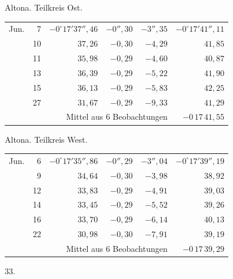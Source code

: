 \noindent\begin{minipage}[t]{.495\textwidth}\centering Altona. Teilkreis Ost.\par\smallskip
{\scriptsize\setlength{\tabcolsep}{1pt}\renewcommand{\arraystretch}{1.2}\begin{tabular}{lr|r|r|r|r|}
Jun.&7&$-0^\circ17'37''{,}46$&$-0''{,}30$&$-3''{,}35$&$-0^\circ17'41''{,}11$\\
&10&$37{,}26$&$-0{,}30$&$-4{,}29$&$41{,}85$\\
&11&$35{,}98$&$-0{,}29$&$-4{,}60$&$40{,}87$\\
&13&$36{,}39$&$-0{,}29$&$-5{,}22$&$41{,}90$\\
&15&$36{,}13$&$-0{,}29$&$-5{,}83$&$42{,}25$\\
&27&$31{,}67$&$-0{,}29$&$-9{,}33$&$41{,}29$\\
\cline{6-6}\multicolumn{5}{r}{Mittel aus 6 Beobachtungen}&$-0\,17\,41{,}55$
\end{tabular}}\end{minipage}\hfill\begin{minipage}[t]{.495\textwidth}\centering Altona. Teilkreis West.\par\smallskip
{\scriptsize\setlength{\tabcolsep}{1pt}\renewcommand{\arraystretch}{1.2}\begin{tabular}{lr|r|r|r|r}
Jun.&6&$-0^\circ17'35''{,}86$&$-0''{,}29$&$-3''{,}04$&$-0^\circ17'39''{,}19$\\
&9&$34{,}64$&$-0{,}30$&$-3{,}98$&$38{,}92$\\
&12&$33{,}83$&$-0{,}29$&$-4{,}91$&$39{,}03$\\
&14&$33{,}45$&$-0{,}29$&$-5{,}52$&$39{,}26$\\
&16&$33{,}70$&$-0{,}29$&$-6{,}14$&$40{,}13$\\
&22&$30{,}98$&$-0{,}30$&$-7{,}91$&$39{,}19$\\
\cline{6-6}\multicolumn{5}{r}{Mittel aus 6 Beobachtungen}&$-0\,17\,39{,}29$
\end{tabular}}\end{minipage}
\par\vspace{4mm}
\begin{center}33.\end{center}

